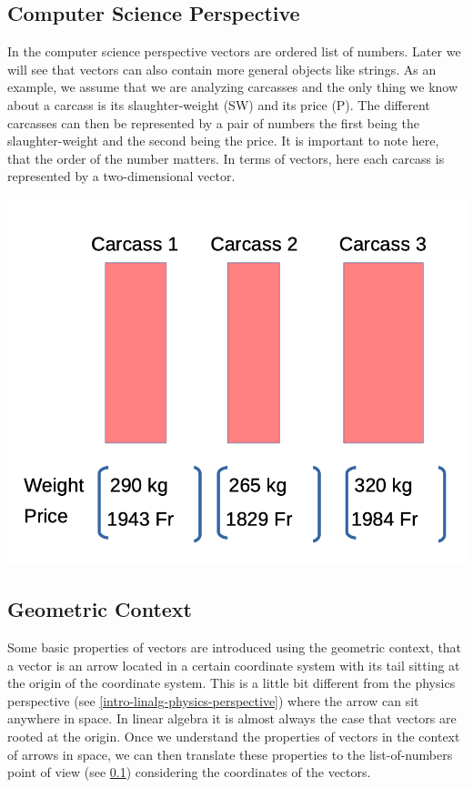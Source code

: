 \documentclass[
]{book}
\theoremstyle{definition}
\theoremstyle{definition}
\theoremstyle{definition}
\theoremstyle{remark}
\begin{document}
\hypertarget{intro-linalg-computer-science-perspective}{%
\subsection{Computer Science Perspective}\label{intro-linalg-computer-science-perspective}}

In the computer science perspective vectors are ordered list of numbers. Later we will see that vectors can also contain more general objects like strings. As an example, we assume that we are analyzing carcasses and the only thing we know about a carcass is its slaughter-weight (SW) and its price (P). The different carcasses can then be represented by a pair of numbers the first being the slaughter-weight and the second being the price. It is important to note here, that the order of the number matters. In terms of vectors, here each carcass is represented by a two-dimensional vector.

\includegraphics[width=12.22in]{odg/vector-cs-perspecitve}

\hypertarget{intro-linalg-geometric-context}{%
\subsection{Geometric Context}\label{intro-linalg-geometric-context}}

Some basic properties of vectors are introduced using the geometric context, that a vector is an arrow located in a certain coordinate system with its tail sitting at the origin of the coordinate system. This is a little bit different from the physics perspective (see \ref{intro-linalg-physics-perspective}) where the arrow can sit anywhere in space. In linear algebra it is almost always the case that vectors are rooted at the origin. Once we understand the properties of vectors in the context of arrows in space, we can then translate these properties to the list-of-numbers point of view (see \ref{intro-linalg-computer-science-perspective}) considering the coordinates of the vectors.
\end{document}
